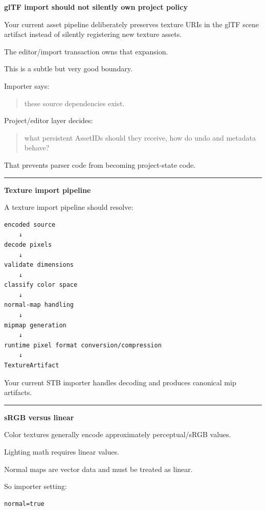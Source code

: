 \textbf{glTF import should not silently own project policy}

Your current asset pipeline deliberately preserves texture URIs in the glTF scene artifact instead of silently registering new texture assets.

The editor/import transaction owns that expansion.

This is a subtle but very good boundary.

Importer says:

\begin{quote}
these source dependencies exist.
\end{quote}

Project/editor layer decides:

\begin{quote}
what persistent AssetIDs should they receive, how do undo and metadata behave?
\end{quote}

That prevents parser code from becoming project-state code.

\begin{center}\rule{0.5\linewidth}{0.5pt}\end{center}

\textbf{Texture import pipeline}

A texture import pipeline should resolve:

\begin{verbatim}
encoded source
    ↓
decode pixels
    ↓
validate dimensions
    ↓
classify color space
    ↓
normal-map handling
    ↓
mipmap generation
    ↓
runtime pixel format conversion/compression
    ↓
TextureArtifact
\end{verbatim}

Your current STB importer handles decoding and produces canonical mip artifacts.

\begin{center}\rule{0.5\linewidth}{0.5pt}\end{center}

\textbf{sRGB versus linear}

Color textures generally encode approximately perceptual/sRGB values.

Lighting math requires linear values.

Normal maps are vector data and must be treated as linear.

So importer setting:

\begin{verbatim}
normal=true
\end{verbatim}

